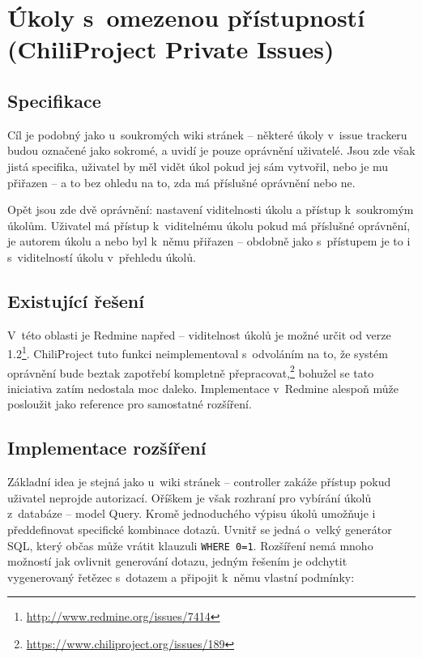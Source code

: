 \documentclass[thesis=B,czech]{FITthesis}[2012/05/02]
\begin{document}
\section[Úkoly s~omezenou přístupností]{Úkoly s~omezenou přístupností (ChiliProject Private Issues)}
\label{sec:private_issues}

\subsection{Specifikace}

Cíl je podobný jako u~soukromých wiki stránek -- některé úkoly v~issue
trackeru budou označené jako sokromé, a uvidí je pouze oprávnění
uživatelé. Jsou zde však jistá specifika, uživatel by měl vidět úkol
pokud jej sám vytvořil, nebo je mu přiřazen -- a to bez ohledu na to,
zda má příslušné oprávnění nebo ne.

Opět jsou zde dvě oprávnění: nastavení viditelnosti úkolu a přístup
k~soukromým úkolům. Uživatel má přístup k~viditelnému úkolu pokud má
příslušné oprávnění, je autorem úkolu a nebo byl k~němu přiřazen --
obdobně jako s~přístupem je to i s~viditelností úkolu v~přehledu úkolů.

\subsection{Existující řešení}
\label{sec:private_issues_exist}

V~této oblasti je Redmine napřed -- viditelnost úkolů je možné určit od
verze 1.2\footnote{\url{http://www.redmine.org/issues/7414}}.
ChiliProject tuto funkci neimplementoval s~odvoláním na to, že systém
oprávnění bude beztak zapotřebí kompletně přepracovat,\footnote{\url{https://www.chiliproject.org/issues/189}}
bohužel se tato iniciativa zatím nedostala moc daleko. Implementace
v~Redmine alespoň může posloužit jako reference pro samostatné
rozšíření.

\subsection{Implementace rozšíření}

Základní idea je stejná jako u~wiki stránek -- controller zakáže přístup
pokud uživatel neprojde autorizací. Oříškem je však rozhraní pro
vybírání úkolů z~databáze -- model Query. Kromě jednoduchého výpisu
úkolů umožňuje i předdefinovat specifické kombinace dotazů. Uvnitř se
jedná o~velký generátor SQL, který občas může vrátit klauzuli
\lstinline!WHERE 0=1!. Rozšíření nemá mnoho možností jak ovlivnit
generování dotazu, jedným řešením je odchytit vygenerovaný řetězec
s~dotazem a připojit k~němu vlastní podmínky:
\end{document}
